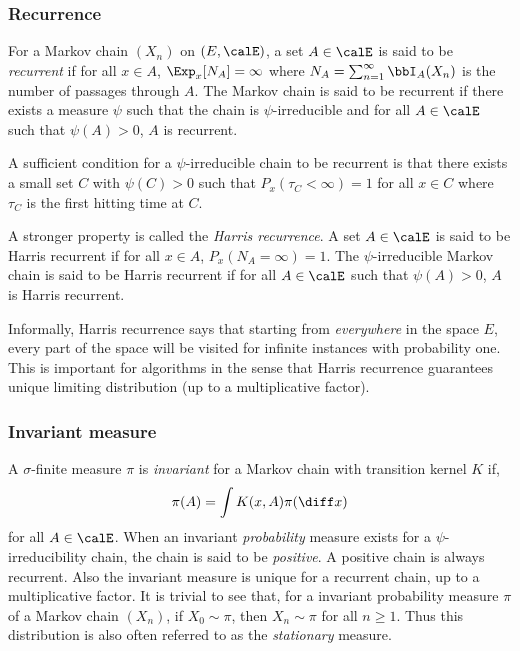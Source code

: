 \subsubsection{Recurrence}
\label{ssub:Recurrence}

For a Markov chain $(X_n)$ on $(E,\calE)$, a set $A\in\calE$ is said to be
\emph{recurrent} if for all $x\in A$, $\Exp_x[N_A] = \infty$ where $N_A =
\sum_{n=1}^{\infty}\bbI_A(X_n)$ is the number of passages through $A$. The
Markov chain is said to be recurrent if there exists a measure $\psi$ such
that the chain is $\psi$-irreducible and for all $A\in\calE$ such that
$\psi(A)>0$, $A$ is recurrent.

A sufficient condition for a $\psi$-irreducible chain to be recurrent is that
there exists a small set $C$ with $\psi(C)>0$ such that $P_x(\tau_C<\infty) =
1$ for all $x\in C$ where $\tau_C$ is the first hitting time at $C$.

A stronger property is called the \emph{Harris recurrence}. A set $A\in\calE$
is said to be Harris recurrent if for all $x\in A$, $P_x(N_A = \infty) = 1$.
The $\psi$-irreducible Markov chain is said to be Harris recurrent if for all
$A\in\calE$ such that $\psi(A)>0$, $A$ is Harris recurrent.

Informally, Harris recurrence says that starting from \emph{everywhere} in the
space $E$, every part of the space will be visited for infinite instances with
probability one. This is important for \mcmc algorithms in the sense that
Harris recurrence guarantees unique limiting distribution (up to a
multiplicative factor).

\subsubsection{Invariant measure}
\label{ssub:Invariant measure}

A $\sigma$-finite measure $\pi$ is \emph{invariant} for a Markov chain with
transition kernel $K$ if,
\begin{equation}
  \pi(A) = \int K(x,A)\pi(\diff x)
\end{equation}
for all $A\in\calE$. When an invariant \emph{probability} measure exists for a
$\psi$-irreducibility chain, the chain is said to be \emph{positive}. A
positive chain is always recurrent. Also the invariant measure is unique for a
recurrent chain, up to a multiplicative factor. It is trivial to see that, for
a invariant probability measure $\pi$ of a Markov chain $(X_n)$, if
$X_0\sim\pi$, then $X_n\sim\pi$ for all $n\ge1$. Thus this distribution is
also often referred to as the \emph{stationary} measure.

